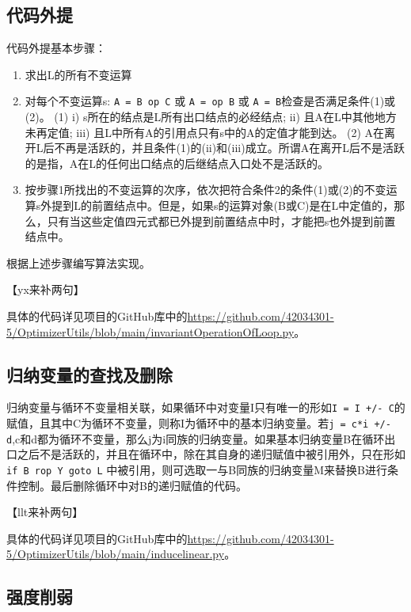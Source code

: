 \documentclass[cn,black,11pt,normal]{elegantnote}
\begin{document}
\subsection{代码外提}

代码外提基本步骤：

\begin{enumerate}
    \item 求出L的所有不变运算
    \item 对每个不变运算s: \lstinline{A = B op C} 或 \lstinline{A = op B}  或 \lstinline{A = B}检查是否满足条件(1)或(2)。
        \subitem (1) i) s所在的结点是L所有出口结点的必经结点; ii) 且A在L中其他地方未再定值; iii) 且L中所有A的引用点只有s中的A的定值才能到达。
        \subitem (2) A在离开L后不再是活跃的，并且条件(1)的(ii)和(iii)成立。所谓A在离开L后不是活跃的是指，A在L的任何出口结点的后继结点入口处不是活跃的。
    \item 按步骤1所找出的不变运算的次序，依次把符合条件2的条件(1)或(2)的不变运算s外提到L的前置结点中。但是，如果s的运算对象(B或C)是在L中定值的，那么，只有当这些定值四元式都已外提到前置结点中时，才能把s也外提到前置结点中。
\end{enumerate}
根据上述步骤编写算法实现。

【yx来补两句】

具体的代码详见项目的GitHub库中的\url{https://github.com/42034301-5/OptimizerUtils/blob/main/invariantOperationOfLoop.py}。

\subsection{归纳变量的查找及删除}

归纳变量与循环不变量相关联，如果循环中对变量I只有唯一的形如\lstinline{I = I +/- C}的赋值，且其中C为循环不变量，则称I为循环中的基本归纳变量。若\lstinline{j = c*i +/- d},c和d都为循环不变量，那么j为i同族的归纳变量。如果基本归纳变量B在循环出口之后不是活跃的，并且在循环中，除在其自身的递归赋值中被引用外，只在形如\lstinline{if B rop Y goto L} 中被引用，则可选取一与B同族的归纳变量M来替换B进行条件控制。最后删除循环中对B的递归赋值的代码。

【llt来补两句】

具体的代码详见项目的GitHub库中的\url{https://github.com/42034301-5/OptimizerUtils/blob/main/inducelinear.py}。

\subsection{强度削弱}
\end{document}
